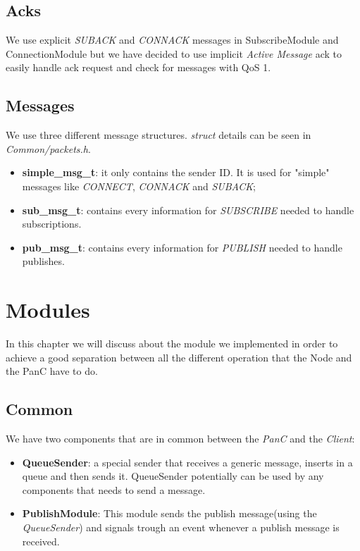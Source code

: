 \documentclass[10pt]{article}
\begin{document}
\subsection{Acks}

We use explicit \emph{SUBACK} and \emph{CONNACK} messages in SubscribeModule and ConnectionModule but we have decided to use implicit \emph{Active Message} ack to easily handle ack request and check for messages with QoS 1.

\subsection{Messages}

We use three different message structures. \emph{struct} details can be seen in \emph{Common/packets.h}.
\begin{itemize}
\item \textbf{simple\_msg\_t}: it only contains the sender ID. It is used for "simple" messages like \emph{CONNECT}, \emph{CONNACK} and \emph{SUBACK};
\item	\textbf{sub\_msg\_t}: contains every information for \emph{SUBSCRIBE} needed to handle subscriptions.
\item \textbf{pub\_msg\_t}: contains every information for \emph{PUBLISH} needed to handle publishes.
\end{itemize}

\section{Modules}

In this chapter we will discuss about the module we implemented in order to achieve a good separation between all the different operation that the Node and the PanC have to do.
\subsection{Common}
We have two components that are in common between the \emph{PanC} and the \emph{Client}:
\begin{itemize}
\item \textbf{QueueSender}: a special sender that receives a generic message, inserts in a queue and then sends it. QueueSender potentially can be used by any components that needs to send a message.
\item \textbf{PublishModule}: This module sends the publish message(using the \emph{QueueSender}) and signals trough an event whenever a publish message is received.
\end{itemize}
\end{document}
